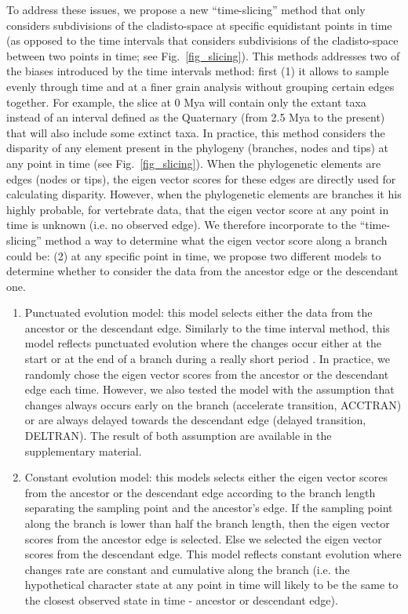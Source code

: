 \documentclass[12pt,letterpaper]{article}
\begin{document}
To address these issues, we propose a new ``time-slicing'' method that only considers subdivisions of the cladisto-space at specific equidistant points in time (as opposed to the time intervals that considers subdivisions of the cladisto-space between two points in time; see Fig.~\ref{fig_slicing}).
This methods addresses two of the biases introduced by the time intervals method: first (1) it allows to sample evenly through time and at a finer grain analysis without grouping certain edges together.
For example, the slice at 0 Mya will contain only the extant taxa instead of an interval defined as the Quaternary (from 2.5 Mya to the present) that will also include some extinct taxa.
In practice, this method considers the disparity of any element present in the phylogeny (branches, nodes and tips) at any point in time (see Fig.~\ref{fig_slicing}).
When the phylogenetic elements are edges (nodes or tips), the eigen vector scores for these edges are directly used for calculating disparity.
However, when the phylogenetic elements are branches it his highly probable, for vertebrate data, that the eigen vector score at any point in time is unknown (i.e. no observed edge).
We therefore incorporate to the ``time-slicing'' method a way to determine what the eigen vector score along a branch could be: (2) at any specific point in time, we propose two different models to determine whether to consider the data from the ancestor edge or the descendant one.
\begin{enumerate}
    \item{Punctuated evolution model:} this model selects either the data from the ancestor or the descendant edge.
    Similarly to the time interval method, this model reflects punctuated evolution where the changes occur either at the start or at the end of a branch during a really short period \citep{Gould1977}.
    In practice, we randomly chose the eigen vector scores from the ancestor or the descendant edge each time.
    However, we also tested the model with the assumption that changes always occurs early on the branch (accelerate transition, ACCTRAN) or are always delayed towards the descendant edge (delayed transition, DELTRAN).
    The result of both assumption are available in the supplementary material.
    \item{Constant evolution model:} this models selects either the eigen vector scores from the ancestor or the descendant edge according to the branch length separating the sampling point and the ancestor's edge.
    If the sampling point along the branch is lower than half the branch length, then the eigen vector scores from the ancestor edge is selected.
    Else we selected the eigen vector scores from the descendant edge.
    This model reflects constant evolution where changes rate are constant and cumulative along the branch (i.e. the hypothetical character state at any point in time will likely to be the same to the closest observed state in time - ancestor or descendant edge).
\end{enumerate}
\end{document}

